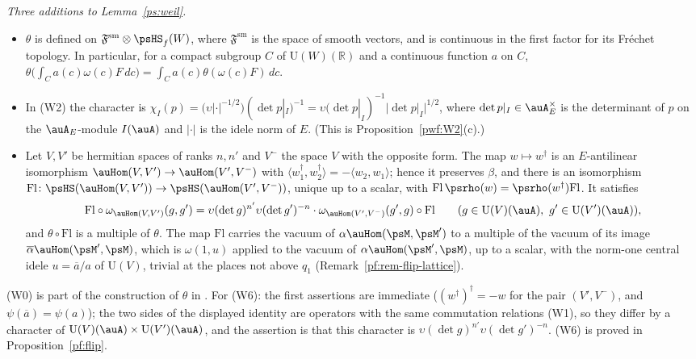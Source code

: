 \documentclass[10pt]{amsart}
\theoremstyle{definition}
\theoremstyle{remark}
\newcommand{\R}{\mathbb R}
\providecommand{\auU}{\mathrm U}
\providecommand{\aubar}[1]{\overline{#1}}
\begin{document}
\emph{Three additions to Lemma~\ref{ps:weil}.}
\begin{itemize}
\item[(W0)] $\theta$ is defined on $\mathfrak F^{\mathrm{sm}}\otimes\psHS_f(W)$, where
$\mathfrak F^{\mathrm{sm}}$ is the space of smooth vectors, and is continuous in the first factor
for its Fr\'echet topology. In particular, for a compact subgroup $C$ of $\auU(W)(\R)$ and a
continuous function $a$ on $C$, $\theta\bigl(\int_Ca(c)\omega(c)F\,dc\bigr)=\int_Ca(c)\theta(\omega(c)F)\,dc$.
\item[(W2$'$)] In (W2) the character is $\chi_I(p)=\bigl(\upsilon|\cdot|^{-1/2}\bigr)(\det p|_I)^{-1}=
\upsilon(\det p|_I)^{-1}|\det p|_I|^{1/2}$, where $\det p|_I\in\auA_E^\times$ is the determinant of
$p$ on the $\auA_E$-module $I(\auA)$ and $|\cdot|$ is the idele norm of $E$. (This is Proposition~\ref{pwf:W2}(c).)
\item[(W6)] Let $V,V'$ be hermitian spaces of ranks $n,n'$ and $V^-$ the space $V$ with the opposite
form. The map $w\mapsto w^\dagger$ is an $E$-antilinear isomorphism $\auHom(V,V')\to\auHom(V',V^-)$
with $\langle w_1^\dagger,w_2^\dagger\rangle=-\langle w_2,w_1\rangle$; hence it preserves $\beta$,
and there is an isomorphism $\mathrm{Fl}\colon\psHS(\auHom(V,V'))\to\psHS(\auHom(V',V^-))$,
unique up to a scalar, with $\mathrm{Fl}\,\psrho(w)=\psrho(w^\dagger)\mathrm{Fl}$. It satisfies
\[
\mathrm{Fl}\circ\omega_{\auHom(V,V')}(g,g')=\upsilon(\det g)^{n'}\upsilon(\det g')^{-n}\cdot
\omega_{\auHom(V',V^-)}(g',g)\circ\mathrm{Fl}\qquad(g\in\auU(V)(\auA),\ g'\in\auU(V')(\auA)),
\]
and $\theta\circ\mathrm{Fl}$ is a multiple of $\theta$. The map $\mathrm{Fl}$ carries the vacuum of
$\alpha\auHom(\psM,\psM')$ to a multiple of the vacuum of its image $\aubar\alpha\auHom(\psM',\psM)$, which
is $\omega(1,u)$ applied to the vacuum of $\alpha\auHom(\psM',\psM)$, up to a scalar, with the norm-one
central idele $u=\aubar a/a$ of $\auU(V)$, trivial at the places not above $q_1$
(Remark~\ref{pf:rem-flip-lattice}).
\end{itemize}
(W0) is part of the construction of $\theta$ in \cite[no.~39, p.~189, and Th\'eor\`eme~6, p.~193]{WeilActa}. For (W6): the first assertions
are immediate ($(w^\dagger)^\dagger=-w$ for the pair $(V',V^-)$, and $\psi(\aubar a)=\psi(a)$); the
two sides of the displayed identity are operators with the same commutation relations (W1), so
they differ by a character of $\auU(V)(\auA)\times\auU(V')(\auA)$, and the assertion is that this
character is $\upsilon(\det g)^{n'}\upsilon(\det g')^{-n}$. 
(W6) is proved in Proposition~\ref{pf:flip}.
\end{document}
